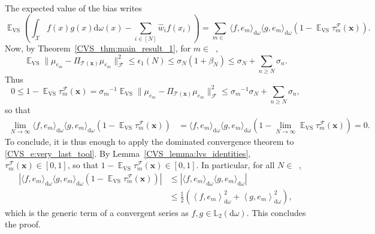 \documentclass[twoside,11pt]{book}
\numberwithin{theorem}{chapter}
\numberwithin{definition}{chapter}
\numberwithin{proposition}{chapter}
\numberwithin{corollary}{chapter}
\numberwithin{example}{chapter}
\numberwithin{lemma}{chapter}
\numberwithin{assumption}{chapter}
\numberwithin{equation}{chapter}
\numberwithin{figure}{chapter}
\DeclareMathOperator{\VS}{\mathrm{VS}}
\DeclareMathOperator{\EX}{\mathbb{E}}
\DeclareMathOperator{\F}{\mathcal{F}}
\DeclareMathOperator{\X}{\mathcal{X}}
\def\Ltwo{\mathbb{L}_{2}(\mathrm{d} \omega)}
\DeclareMathOperator{\Ns}{\mathbb{N}^{*}}
\begin{document}
The expected value of the bias writes
\begin{equation}
\EX_{\VS} \left( \int_{\X} f(x)g(x) \mathrm{d}\omega(x) - \sum\limits_{i \in [N]} \widehat{w}_{i}f(x_{i}) \right)= \sum\limits_{m \in \Ns} \langle f,e_{m} \rangle_{\mathrm{d}\omega}\langle g,e_{m} \rangle_{\mathrm{d}\omega} \left( 1- \EX_{\VS}\tau_{m}^{\F}(\bm{x}) \right).
\label{CVS_e:very_last_tool}
\end{equation}
Now, by Theorem~\ref{CVS_thm:main_result_1}, for $m \in \Ns$,
\begin{equation}
\EX_{\VS} \|\mu_{e_{m}} - \Pi_{\mathcal{T}(\bm{x})} \mu_{e_{m}}\|_{\F}^{2} \leq \epsilon_{1}(N) \leq \sigma_{N}(1+\beta_{N}) \leq \sigma_{N} + \sum\limits_{n \geq N} \sigma_{n}.
\end{equation}
Thus
\begin{equation}
0 \leq 1-\EX_{\VS} \tau_{m}^{\F}(\bm{x}) = {\sigma_m}^{-1} \EX_{\VS} \|\mu_{e_{m}} - \Pi_{\mathcal{T}(\bm{x})} \mu_{e_{m}}\|_{\F}^{2} \leq {\sigma_{m}}^{-1}{\sigma_{N} + \sum\limits_{n \geq N} \sigma_{n}},
\end{equation}
so that
\begin{align}
\lim_{N \rightarrow \infty} \langle f,e_{m} \rangle_{\mathrm{d}\omega}\langle g,e_{m} \rangle_{\mathrm{d}\omega} \left(1- \EX_{\VS}\tau_{m}^{\F}(\bm{x}) \right) & = \langle f,e_{m} \rangle_{\mathrm{d}\omega}\langle g,e_{m} \rangle_{\mathrm{d}\omega} (1-\lim_{N \rightarrow \infty} \EX_{\VS}\tau_{m}^{\F}(\bm{x})) = 0.
\end{align}
To conclude, it is thus enough to apply the dominated convergence theorem to \eqref{CVS_e:very_last_tool}. By Lemma~\ref{CVS_lemma:lvs_identities}, $\tau_{m}^{\F}(\bm{x}) \in [0,1]$, so that $1-\EX_{\VS}\tau_{m}^{\F}(\bm{x}) \in [0,1]$.
In particular, for all $N \in \Ns$,
\begin{align}
|\langle f,e_{m} \rangle_{\mathrm{d}\omega}\langle g,e_{m} \rangle_{\mathrm{d}\omega} \left(1- \EX_{\VS}\tau_{m}^{\F}(\bm{x}) \right)| & \leq |\langle f,e_{m} \rangle_{\mathrm{d}\omega}\langle g,e_{m} \rangle_{\mathrm{d}\omega}|\\
& \leq \frac{1}{2}\left(\left\langle f,e_{m} \right\rangle_{\mathrm{d}\omega}^{2} + \left\langle g,e_{m} \right\rangle_{\mathrm{d}\omega}^{2}\right),
\end{align}
which is the generic term of a convergent series as $f,g\in\Ltwo$. This concludes the proof.
\end{document}
